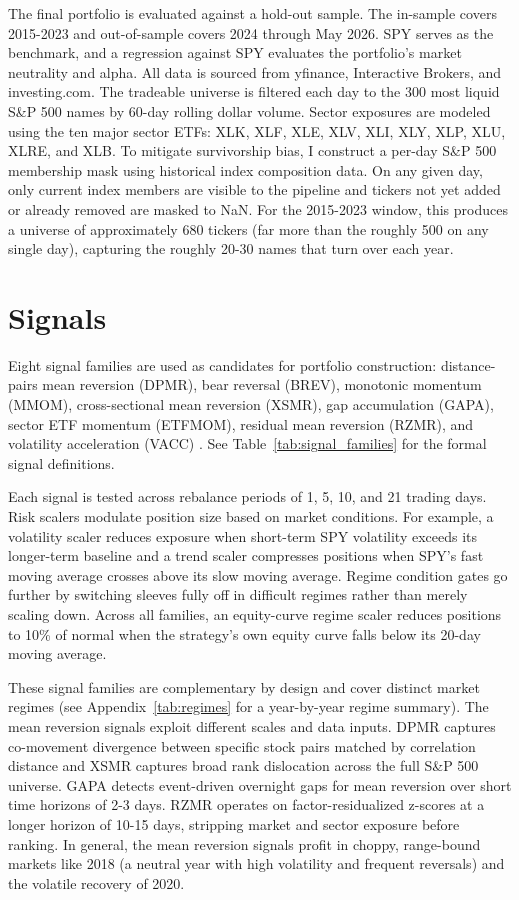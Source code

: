 \documentclass{article}
\begin{document}
The final portfolio is evaluated against a hold-out sample. The in-sample covers 2015-2023 and out-of-sample covers 2024 through May 2026. SPY serves as the benchmark, and a regression against SPY evaluates the portfolio's market neutrality and alpha. All data is sourced from yfinance, Interactive Brokers, and investing.com. The tradeable universe is filtered each day to the 300 most liquid S\&P 500 names by 60-day rolling dollar volume. Sector exposures are modeled using the ten major sector ETFs: XLK, XLF, XLE, XLV, XLI, XLY, XLP, XLU, XLRE, and XLB. To mitigate survivorship bias, I construct a per-day S\&P 500 membership mask using historical index composition data. On any given day, only current index members are visible to the pipeline and tickers not yet added or already removed are masked to NaN. For the 2015-2023 window, this produces a universe of approximately 680 tickers (far more than the roughly 500 on any single day), capturing the roughly 20-30 names that turn over each year.

\section{Signals}

Eight signal families are used as candidates for portfolio construction: distance-pairs mean reversion (DPMR), bear reversal (BREV), monotonic momentum (MMOM), cross-sectional mean reversion (XSMR), gap accumulation (GAPA), sector ETF momentum (ETFMOM), residual mean reversion (RZMR), and volatility acceleration (VACC) \cite{Chan2009, Chan2013}. See Table~\ref{tab:signal_families} for the formal signal definitions.

Each signal is tested across rebalance periods of 1, 5, 10, and 21 trading days. Risk scalers modulate position size based on market conditions. For example, a volatility scaler reduces exposure when short-term SPY volatility exceeds its longer-term baseline and a trend scaler compresses positions when SPY's fast moving average crosses above its slow moving average. Regime condition gates go further by switching sleeves fully off in difficult regimes rather than merely scaling down. Across all families, an equity-curve regime scaler reduces positions to 10\% of normal when the strategy's own equity curve falls below its 20-day moving average.

These signal families are complementary by design and cover distinct market regimes (see Appendix~\ref{tab:regimes} for a year-by-year regime summary). The mean reversion signals exploit different scales and data inputs. DPMR captures co-movement divergence between specific stock pairs matched by correlation distance \cite{Gatev2006} and XSMR captures broad rank dislocation across the full S\&P 500 universe. GAPA detects event-driven overnight gaps for mean reversion over short time horizons of 2-3 days. RZMR operates on factor-residualized z-scores at a longer horizon of 10-15 days, stripping market and sector exposure before ranking. In general, the mean reversion signals profit in choppy, range-bound markets like 2018 (a neutral year with high volatility and frequent reversals) and the volatile recovery of 2020.
\end{document}
